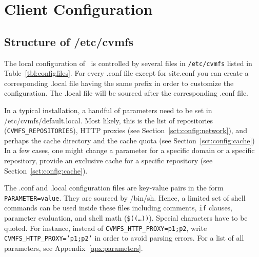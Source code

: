 \chapter{Client Configuration}

\section{Structure of /etc/cvmfs}
The local configuration of \cvmfs\ is controlled by several files in \texttt{/etc/cvmfs} listed in Table~\ref{tbl:configfiles}.
For every .conf file except for site.conf you can create a corresponding .local file having the same prefix in order to customize the configuration.
The .local file will be sourced after the corresponding .conf file.

In a typical installation, a handful of parameters need to be set in /etc/cvmfs/default.local.
Most likely, this is the list of repositories (\texttt{CVMFS\_REPOSITORIES}), HTTP proxies (see Section~\ref{sct:config:network}), and perhaps the cache directory and the cache quota (see Section~\ref{sct:config:cache})
In a few cases, one might change a parameter for a specific domain or a specific repository, \eg provide an exclusive cache for a specific repository (see Section~\ref{sct:config:cache}).

The .conf and .local configuration files are key-value pairs in the form \texttt{PARAMETER=value}.
They are sourced by /bin/sh.
Hence, a limited set of shell commands can be used inside these files including comments, \texttt{if} clauses, parameter evaluation, and shell math (\texttt{\$((\dots))}).
Special characters have to be quoted.
For instance, instead of \texttt{CVMFS\_HTTP\_PROXY=p1;p2}, write \texttt{CVMFS\_HTTP\_PROXY='p1;p2'} in order to avoid parsing errors.
For a list of all parameters, see Appendix~\ref{apx:parameters}.

